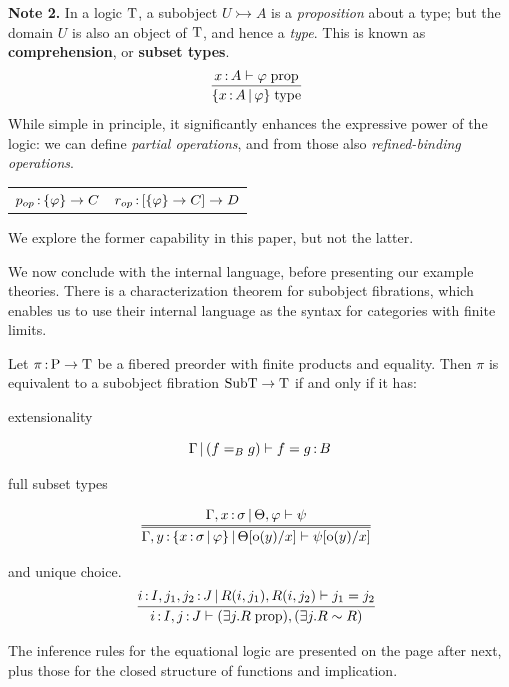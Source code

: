 \documentclass{article}
\begin{document}
\vspace{1em}

\textbf{Note 2.} In a logic $\mathrm{T}$, a subobject $U\rightarrowtail A$ is a \textit{proposition} about a type; but the domain $U$ is also an object of $\mathrm{T}$, and hence a \textit{type}. This is known as \textbf{comprehension}, or \textbf{subset types}.
\[\infr{x\of A\vdash \varphi\;\mrm{prop}}{\{x\of A\ctx \varphi\}\;\mrm{type}}\]
While simple in principle, it significantly enhances the expressive power of the logic: we can define \textit{partial operations}, and from those also \textit{refined-binding operations}.
\begin{center}
    \begin{tabular}{c@{\qquad\qquad}c}
         $p_{op}\,{:}\, \{\varphi\}\to C$ & 
         $r_{op}\,{:}\, [\{\varphi\}\to C]\to D$
    \end{tabular}
\end{center}
We explore the former capability in this paper, but not the latter.

\vspace{1em}

We now conclude with the internal language, before presenting our example theories. There is a characterization theorem for subobject fibrations, which enables us to use their internal language as the syntax for categories with finite limits.

\begin{theorem}
    Let $\pi\,{:}\, \mathrm{P\to T}$ be a fibered preorder with finite products and equality. Then $\pi$ is equivalent to a subobject fibration $\mathrm{SubT\to T}$ if and only if it has:
    
    extensionality
    
    \[\Gamma\,|\, (f=_B g) \vdash f=g\,{:}\, B\]
    
    full subset types
    
    \[
        \infre{\Gamma,x\of \sigma\ctx \Theta,\varphi \vdash \psi}{\Gamma, y\of\{x\of \sigma\pr \varphi\}\ctx \Theta[\mrm{o}(y)/x] \vdash \psi [\mrm{o}(y)/x]}
    \]
        
    and unique choice.
    \[\infr{
            i\of I, j_1,j_2\of J\ctx R(i,j_1), R(i,j_2)\vdash j_1=j_2
        }{
            i\of I, j\of J \vdash (\exists j.R\; \mrm{prop}), (\exists j.R \sim R)}\]
\end{theorem}
The inference rules for the equational logic are presented on the page after next, plus those for the closed structure of functions and implication.
\end{document}
